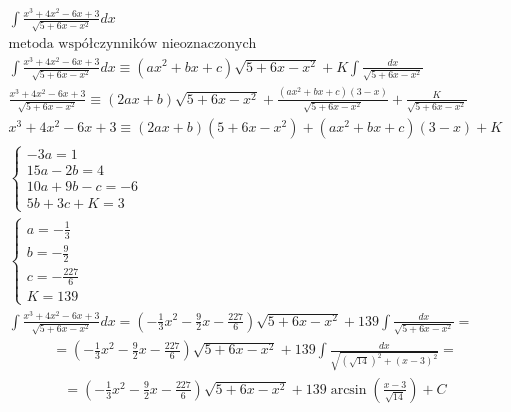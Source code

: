 \begin{gather*}
  \int \frac{x^3+4x^2-6x+3}{\sqrt{5+6x-x^2}}dx \\
  \text{metoda współczynników nieoznaczonych} \\
  \int \frac{x^3+4x^2-6x+3}{\sqrt{5+6x-x^2}}dx \equiv (ax^2+bx+c)\sqrt{5+6x-x^2}+K\int \frac{dx}{\sqrt{5+6x-x^2}} \\
\frac{x^3+4x^2-6x+3}{\sqrt{5+6x-x^2}} \equiv (2ax+b)\sqrt{5+6x-x^2}+\frac{(ax^2+bx+c)(3-x)}{\sqrt{5+6x-x^2}}+ \frac{K}{\sqrt{5+6x-x^2}} \\
x^3+4x^2-6x+3 \equiv (2ax+b)(5+6x-x^2)+(ax^2+bx+c)(3-x)+K \\
\begin{cases} -3a=1 \\ 15a-2b=4 \\ 10a+9b-c=-6 \\ 5b+3c+K=3 \end{cases} \\
\begin{cases} a=-\frac{1}{3} \\ b=-\frac{9}{2} \\ c=-\frac{227}{6} \\ K=139 \end{cases} \\
\int \frac{x^3+4x^2-6x+3}{\sqrt{5+6x-x^2}}dx = (-\frac{1}{3}x^2-\frac{9}{2}x-\frac{227}{6})\sqrt{5+6x-x^2}+139\int \frac{dx}{\sqrt{5+6x-x^2}} = \end{gather*}
\begin{gather*}= (-\frac{1}{3}x^2-\frac{9}{2}x-\frac{227}{6})\sqrt{5+6x-x^2}+139\int \frac{dx}{\sqrt{(\sqrt{14})^2+(x-3)^2}} = \end{gather*}
\begin{gather*}= (-\frac{1}{3}x^2-\frac{9}{2}x-\frac{227}{6})\sqrt{5+6x-x^2}+139\arcsin \left(\frac{x-3}{\sqrt{14}}\right)+C\end{gather*}



